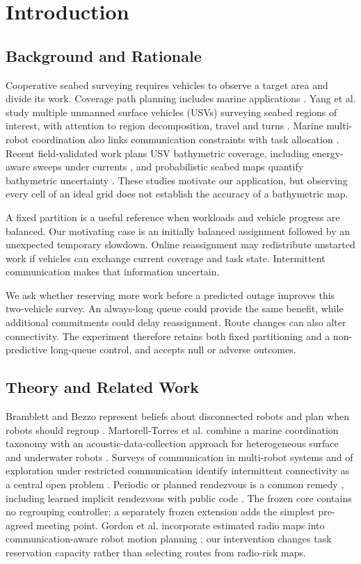 \section{Introduction}
\subsection{Background and Rationale}
Cooperative seabed surveying requires vehicles to observe a target area and divide its work. Coverage path planning includes marine applications \cite{galceran2013coverage}. Yang et al. study multiple unmanned surface vehicles (USVs) surveying seabed regions of interest, with attention to region decomposition, travel and turns \cite{yang2023cooperative}. Marine multi-robot coordination also links communication constraints with task allocation \cite{martorell2024coordination}. Recent field-validated work plans USV bathymetric coverage, including energy-aware sweeps under currents \cite{zhao2024optimal,zhao2024energy}, and probabilistic seabed maps quantify bathymetric uncertainty \cite{torroba2022svgp}. These studies motivate our application, but observing every cell of an ideal grid does not establish the accuracy of a bathymetric map.

A fixed partition is a useful reference when workloads and vehicle progress are balanced. Our motivating case is an initially balanced assignment followed by an unexpected temporary slowdown. Online reassignment may redistribute unstarted work if vehicles can exchange current coverage and task state. Intermittent communication makes that information uncertain.

We ask whether reserving more work before a predicted outage improves this two-vehicle survey. An always-long queue could provide the same benefit, while additional commitments could delay reassignment. Route changes can also alter connectivity. The experiment therefore retains both fixed partitioning and a non-predictive long-queue control, and accepts null or adverse outcomes.

\subsection{Theory and Related Work}
Bramblett and Bezzo represent beliefs about disconnected robots and plan when robots should regroup \cite{bramblett2023epistemic}. Martorell-Torres et al. combine a marine coordination taxonomy with an acoustic-data-collection approach for heterogeneous surface and underwater robots \cite{martorell2024coordination}. Surveys of communication in multi-robot systems and of exploration under restricted communication identify intermittent connectivity as a central open problem \cite{gielis2022review,amigoni2017survey}. Periodic or planned rendezvous is a common remedy \cite{hollinger2010periodic,dasilva2024rendezvous}, including learned implicit rendezvous with public code \cite{tan2024ir2}. The frozen core contains no regrouping controller; a separately frozen extension adds the simplest pre-agreed meeting point. Gordon et al. incorporate estimated radio maps into communication-aware robot motion planning \cite{gordon2026communication}; our intervention changes task reservation capacity rather than selecting routes from radio-risk maps.

